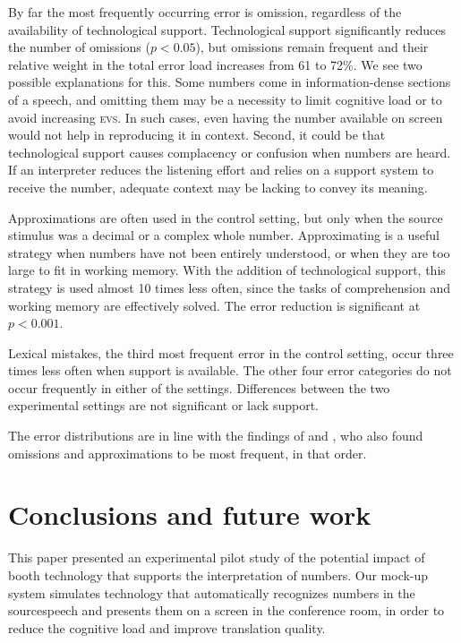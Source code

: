 \documentclass[output=paper]{langsci/langscibook}
\begin{document}
By far the most frequently occurring error is omission, regardless of the availability of technological support. Technological support significantly reduces the number of omissions ($p < 0.05$), but omissions remain frequent and their relative weight in the total error load increases from 61 to 72\%. We see two possible explanations for this. Some numbers come in information-dense sections of a speech, and omitting them may be a necessity to limit cognitive load or to avoid increasing \textsc{evs}. In such cases, even having the number available on screen would not help in reproducing it in context. Second, it could be that technological support causes complacency or confusion when numbers are heard. If an interpreter reduces the listening effort and relies on a support system to receive the number, adequate context may be lacking to convey its meaning.

Approximations are often used in the control setting, but only when the source stimulus was a decimal or a complex whole number. Approximating is a useful strategy when numbers have not been entirely understood, or when they are too large to fit in working memory. With the addition of technological support, this strategy is used almost 10 times less often, since the tasks of comprehension and working memory are effectively solved. The error reduction is significant at $p < 0.001$.

Lexical mistakes, the third most frequent error in the control setting, occur three times less often when support is available. The other four error categories do not occur frequently in either of the settings. Differences between the two experimental settings are not significant or lack support.

The error distributions are in line with the findings of \citet{Mazza2001} and \citet{Pinochi2009}, who also found omissions and approximations to be most frequent, in that order.

\section{Conclusions and future work}\largerpage[1]

This paper presented an experimental pilot study of the potential impact of booth technology that supports the interpretation of numbers. Our mock-up system simulates technology that automatically recognizes numbers in the source\linebreak speech and presents them on a screen in the conference room, in order to reduce the cognitive load and improve translation quality. 
\end{document}
